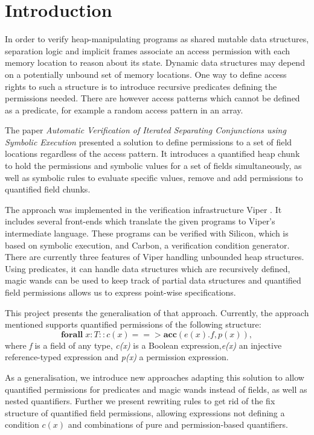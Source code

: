 \documentclass[12pt]{article}
\begin{document}
\section{Introduction}
In order to verify heap-manipulating programs as shared mutable data structures, separation logic \cite{reynolds2002separation} and implicit frames \cite{smans2009implicit} associate an access permission with each memory location to reason about its state. 
Dynamic data structures may depend on a potentially unbound set of memory locations. One way to define access rights to such a structure is to introduce recursive predicates defining the permissions needed. There are however access patterns which cannot be defined as a predicate, for example a random access pattern in an array.

The paper \textit{Automatic Verification of Iterated Separating Conjunctions using Symbolic Execution} \cite{isc} presented a solution to define permissions to a set of field locations regardless of the access pattern. It introduces a quantified heap chunk to hold the permissions and symbolic values for a set of fields simultaneously, as well as symbolic rules to evaluate specific values, remove and add permissions to quantified field chunks.

The approach was implemented in the verification infrastructure Viper \cite{viper}. It includes several front-ends which translate the given programs to Viper's intermediate language. These programs can be verified with Silicon, which is based on symbolic execution, and Carbon, a verification condition generator. There are currently three features of Viper handling unbounded heap structures. Using predicates, it can handle data structures which are recursively defined, magic wands \cite{magicwand} can be used to keep track of partial data structures and quantified field permissions \cite{isc} allows us to express point-wise specifications. 

This project presents the generalisation of that approach. Currently, the approach mentioned supports quantified permissions of the following structure:
\begin{equation}
	\mathbf{forall} \; x:T :: c(x) ==>\mathbf{acc}( e(x).f, p(x) ) ,
\end{equation}
where {\it f} is a field of any type, {\it c(x)} is  a Boolean expression,{\it e(x)} an injective reference-typed expression and {\it p(x)} a permission expression.

As a generalisation, we introduce new approaches adapting this solution to allow quantified permissions for predicates \cite{predicates} and magic wands \cite{magicwand} instead of fields, as well as  nested quantifiers. Further we present rewriting rules to get rid of the fix structure of quantified field permissions, allowing expressions not defining a condition \(c(x)\) and combinations of pure and permission-based quantifiers.
\end{document}
